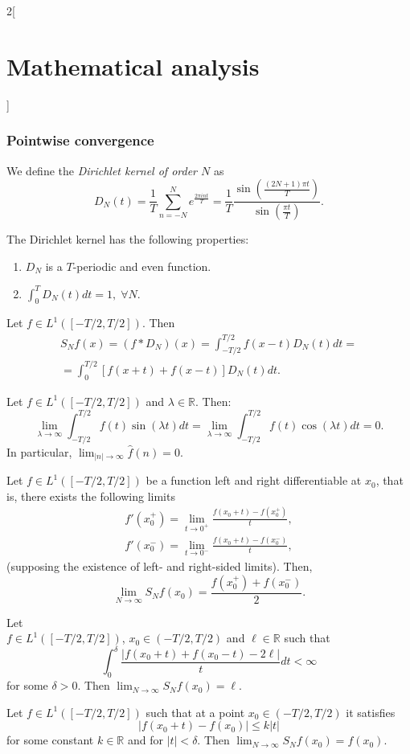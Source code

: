 \documentclass[../../../main.tex]{subfiles}
\begin{document}
\begin{multicols}{2}[\section{Mathematical analysis}]
\subsubsection*{Pointwise convergence}
\begin{definition}
We define the \textit{Dirichlet kernel of order $N$} as $$D_N(t)=\frac{1}{T}\sum_{n=-N}^Ne^{\frac{2\pi int}{T}}=\frac{1}{T}\frac{\sin\left(\frac{(2N+1)\pi t}{T}\right)}{\sin\left(\frac{\pi t}{T}\right)}.$$
\end{definition}
\begin{prop}
The Dirichlet kernel has the following properties:
\begin{enumerate}
    \item $D_N$ is a $T$-periodic and even function.
    \item $\displaystyle\int_0^TD_N(t)dt=1,\;\forall N$.
\end{enumerate}
\end{prop}
\begin{prop}
Let $f\in L^1([-T/2,T/2])$. Then 
\begin{multline*}
    S_Nf(x)=(f*D_N)(x)=\int_{-T/2}^{T/2}f(x-t)D_N(t)dt=\\=\int_0^{T/2}[f(x+t)+f(x-t)]D_N(t)dt.
\end{multline*}
\end{prop}
\begin{lemma}
Let $f\in L^1([-T/2,T/2])$ and $\lambda\in\mathbb{R}$. Then: $$\lim_{\lambda\to\infty}\int_{-T/2}^{T/2}f(t)\sin(\lambda t)dt=\lim_{\lambda\to\infty}\int_{-T/2}^{T/2}f(t)\cos(\lambda t)dt=0.$$ In particular, $\displaystyle\lim_{|n|\to\infty}\widehat{f}(n)=0$.
\end{lemma}
\begin{theorem}
Let $f\in L^1([-T/2,T/2])$ be a function left and right differentiable at $x_0$, that is, there exists the following limits
\begin{gather*}f'(x_0^+)=\lim_{t\to0^+}\frac{f(x_0+t)-f(x_0^+)}{t},\\ f'(x_0^-)=\lim_{t\to0^-}\frac{f(x_0+t)-f(x_0^-)}{t},\end{gather*}(supposing the existence of left- and right-sided limits). Then, $$\lim_{N\to\infty}S_Nf(x_0)=\frac{f(x_0^+)+f(x_0^-)}{2}.$$
\end{theorem}
\begin{theorem}
Let \\$f\in L^1([-T/2,T/2])$, $x_0\in (-T/2,T/2)$ and $\ell\in\mathbb{R}$ such that $$\int_0^\delta\frac{|f(x_0+t)+f(x_0-t)-2\ell|}{t}dt<\infty$$ for some $\delta>0$. Then $\displaystyle\lim_{N\to\infty}S_Nf(x_0)=\ell$.
\end{theorem}
\begin{theorem}
Let $f\in L^1([-T/2,T/2])$ such that at a point $x_0\in (-T/2,T/2)$ it satisfies $$|f(x_0+t)-f(x_0)|\leq k|t|$$ for some constant $k\in\mathbb{R}$ and for $|t|<\delta$. Then $\displaystyle\lim_{N\to\infty}S_Nf(x_0)=f(x_0)$.
\end{theorem}

\end{multicols}
\end{document}
